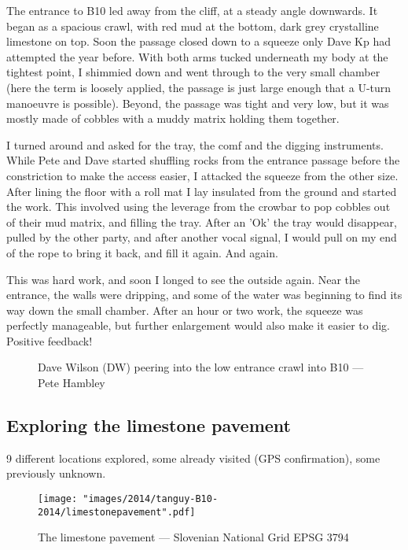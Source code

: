 The entrance to B10 led away from the cliff, at a steady angle downwards. It began as a spacious crawl, with red mud at the bottom, dark grey crystalline limestone on top. Soon the passage closed down to a squeeze only Dave Kp had attempted the year before. With both arms tucked underneath my body at the tightest point, I shimmied down and went through to the very small chamber (here the term is loosely applied, the passage is just large enough that a U-turn manoeuvre is possible). Beyond, the passage was tight and very low, but it was mostly made of cobbles with a muddy matrix holding them together. 

I turned around and asked for the tray, the comf and the digging instruments. While Pete and Dave started shuffling rocks from the entrance passage before the constriction to make the access easier, I attacked the squeeze from the other size. After lining the floor with a roll mat I lay insulated from the ground and started the work. This involved using the leverage from the crowbar to pop cobbles out of their mud matrix, and filling the tray. After an 'Ok' the tray would disappear, pulled by the other party, and after another vocal signal, I would pull on my end of the rope to bring it back, and fill it again. And again. 

This was hard work, and soon I longed to see the outside again. Near the entrance, the walls were dripping, and some of the water was beginning to find its way down the small chamber. After an hour or two work, the squeeze was perfectly manageable, but further enlargement would also make it easier to dig. Positive feedback!

\begin{figure*}[t!]
	\checkoddpage \ifoddpage \forcerectofloat \else \forceversofloat \fi
	\centering
	\label{stalactites Atlantis}
	\caption{Dave Wilson (DW) peering into the low entrance crawl into B10 --- Pete Hambley}
\end{figure*}


\subsection{Exploring the limestone pavement}
9 different locations explored, some already visited (GPS confirmation), some previously unknown.

\begin{figure}[t!]
	\checkoddpage \ifoddpage \forcerectofloat \else \forceversofloat \fi
	\centering
	
	\texttt{[image: "images/2014/tanguy-B10-2014/limestonepavement".pdf]}
	
	\label{stalactites Atlantis}
	\caption{The limestone pavement --- Slovenian National Grid EPSG 3794}
\end{figure}



